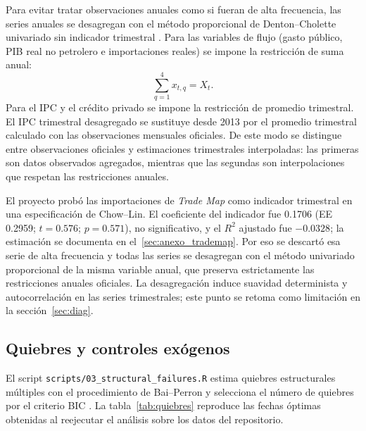 \documentclass[11pt,a4paper]{article}
\begin{document}
Para evitar tratar observaciones anuales como si fueran de alta frecuencia, las
series anuales se desagregan con el método proporcional de Denton--Cholette
univariado sin indicador trimestral
\parencite{denton1971,cholette1984,tempdisagg}. Para las variables de flujo (gasto
público, PIB real no petrolero e importaciones reales) se impone la
restricción de suma anual:
\[
\sum_{q=1}^{4} x_{t,q} = X_t .
\]
Para el IPC y el crédito privado se impone la restricción de promedio
trimestral. El IPC trimestral desagregado se sustituye desde 2013 por el promedio
trimestral calculado con las observaciones mensuales oficiales. De este modo se
distingue entre observaciones oficiales y estimaciones trimestrales
interpoladas: las primeras son datos observados agregados, mientras que las
segundas son interpolaciones que respetan las restricciones anuales.

El proyecto probó las importaciones de \emph{Trade Map} como indicador
trimestral en una especificación de Chow--Lin. El coeficiente del indicador fue
0.1706 (EE 0.2959; $t=0.576$; $p=0.571$), no significativo, y el $R^2$ ajustado
fue $-0.0328$; la estimación se documenta en el~\ref{sec:anexo_trademap}.
Por eso se descartó esa serie de alta frecuencia y todas las series se
desagregan con el método univariado proporcional de la misma variable anual,
que preserva estrictamente las restricciones anuales oficiales. La
desagregación induce suavidad determinista y autocorrelación en las
series trimestrales; este punto se retoma como limitación en la
sección~\ref{sec:diag}.

\subsection{Quiebres y controles exógenos}
\label{sec:quiebres}

El script \texttt{scripts/03\_structural\_failures.R} estima quiebres
estructurales múltiples con el procedimiento de Bai--Perron y selecciona el
número de quiebres por el criterio BIC \parencite{baiperron1998,baiperron2003}.
La tabla~\ref{tab:quiebres} reproduce las fechas óptimas obtenidas al
reejecutar el análisis sobre los datos del repositorio.
\end{document}
